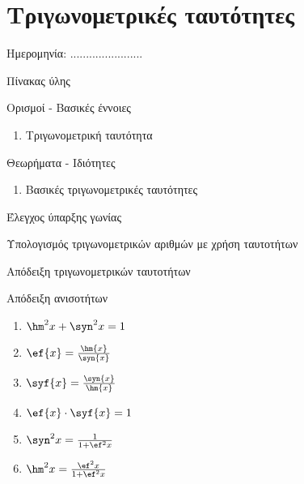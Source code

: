 \documentclass[twoside,nofonts,internet,math,spyros]{frontisthrio}
\newcommand{\myitem}{\stepcounter{enumi}\item[\raisebox{0.5mm}{\faExclamationTriangle}\ \Large$\square$]}
\begin{document}
\section{Τριγωνομετρικές ταυτότητες}
\begin{flushright}
\faCalendar* Ημερομηνία: .......................
\end{flushright}
\begin{mybox}[mysubtitle]{Πίνακας ύλης}
\begin{tcbraster}[raster columns=2,raster equal height]
\begin{myleftbox}{Ορισμοί - Βασικές έννοιες\ \ \faBook}
\begin{enumerate}[itemsep=0mm]
\item Τριγωνομετρική ταυτότητα
\end{enumerate}
\end{myleftbox}
\begin{myrightbox}{Θεωρήματα - Ιδιότητες\ \ \faTools}
\begin{enumerate}[itemsep=0mm]
\item Βασικές τριγωνομετρικές ταυτότητες
\end{enumerate}
\end{myrightbox}
\end{tcbraster}
\begin{multicols}{2}
\begin{todolist}[itemsep=0mm]
\item Έλεγχος ύπαρξης γωνίας
\myitem Υπολογισμός τριγωνομετρικών αριθμών με χρήση ταυτοτήτων
\myitem Απόδειξη τριγωνομετρικών ταυτοτήτων
\item Απόδειξη ανισοτήτων
\end{todolist}
\end{multicols}
\begin{multicols}{2}
\begin{enumerate}[itemsep=0mm]
\item $ \hm^2{x}+\syn^2{x}=1 $
\item $ \ef{x}=\frac{\hm{x}}{\syn{x}} $
\item $ \syf{x}=\frac{\syn{x}}{\hm{x}} $
\item $ \ef{x}\cdot\syf{x}=1 $
\item $ \syn^2{x}=\frac{1}{1+\ef^2{x}} $
\item $ \hm^2{x}=\frac{\ef^2{x}}{1+\ef^2{x}} $
\end{enumerate}
\end{multicols}
\end{mybox}
\newpage
\end{document}
